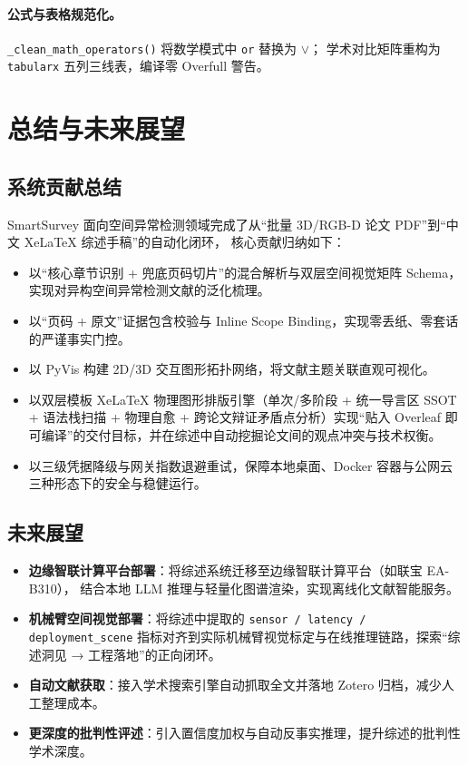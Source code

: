 \documentclass[a4paper,11pt]{article}
\begin{document}
\paragraph{公式与表格规范化。}
\texttt{\_clean\_math\_operators()} 将数学模式中 \texttt{or} 替换为 $\lor$；
学术对比矩阵重构为 \texttt{tabularx} 五列三线表，编译零 Overfull 警告。

\section{总结与未来展望}

\subsection{系统贡献总结}
SmartSurvey 面向空间异常检测领域完成了从``批量 3D/RGB-D 论文 PDF''到``中文 XeLaTeX 综述手稿''的自动化闭环，
核心贡献归纳如下：
\begin{itemize}
  \item 以``核心章节识别 + 兜底页码切片''的混合解析与双层空间视觉矩阵 Schema，实现对异构空间异常检测文献的泛化梳理。
  \item 以``页码 + 原文''证据包含校验与 Inline Scope Binding，实现零丢纸、零套话的严谨事实门控。
  \item 以 PyVis 构建 2D/3D 交互图形拓扑网络，将文献主题关联直观可视化。
  \item 以双层模板 XeLaTeX 物理图形排版引擎（单次/多阶段 + 统一导言区 SSOT + 语法栈扫描 + 物理自愈 + 跨论文辩证矛盾点分析）实现``贴入 Overleaf 即可编译''的交付目标，并在综述中自动挖掘论文间的观点冲突与技术权衡。
  \item 以三级凭据降级与网关指数退避重试，保障本地桌面、Docker 容器与公网云三种形态下的安全与稳健运行。
\end{itemize}

\subsection{未来展望}
\begin{itemize}
  \item \textbf{边缘智联计算平台部署}：将综述系统迁移至边缘智联计算平台（如联宝 EA-B310），
        结合本地 LLM 推理与轻量化图谱渲染，实现离线化文献智能服务。
  \item \textbf{机械臂空间视觉部署}：将综述中提取的 \texttt{sensor / latency / deployment\_scene}
        指标对齐到实际机械臂视觉标定与在线推理链路，探索``综述洞见 → 工程落地''的正向闭环。
  \item \textbf{自动文献获取}：接入学术搜索引擎自动抓取全文并落地 Zotero 归档，减少人工整理成本。
  \item \textbf{更深度的批判性评述}：引入置信度加权与自动反事实推理，提升综述的批判性学术深度。
\end{itemize}
\end{document}
